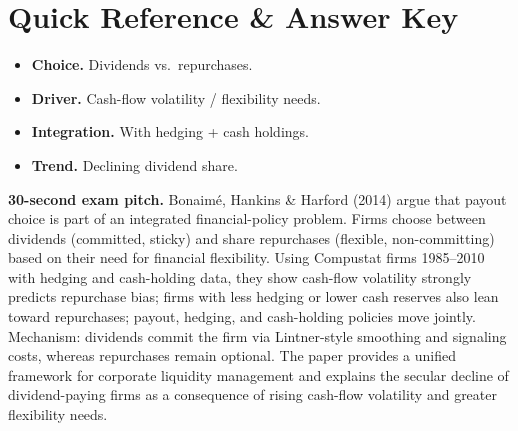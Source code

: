 \documentclass[11pt]{article}
\begin{document}
\section*{Quick Reference \& Answer Key}
\begin{answerbox}
\begin{itemize}
\item \textbf{Choice.} Dividends vs.\ repurchases.
\item \textbf{Driver.} Cash-flow volatility / flexibility needs.
\item \textbf{Integration.} With hedging + cash holdings.
\item \textbf{Trend.} Declining dividend share.
\end{itemize}
\end{answerbox}

\begin{keybox}
\textbf{30-second exam pitch.} Bonaim\'e, Hankins \& Harford (2014) argue that payout choice is part of an integrated financial-policy problem. Firms choose between dividends (committed, sticky) and share repurchases (flexible, non-committing) based on their need for financial flexibility. Using Compustat firms 1985--2010 with hedging and cash-holding data, they show cash-flow volatility strongly predicts repurchase bias; firms with less hedging or lower cash reserves also lean toward repurchases; payout, hedging, and cash-holding policies move jointly. Mechanism: dividends commit the firm via Lintner-style smoothing and signaling costs, whereas repurchases remain optional. The paper provides a unified framework for corporate liquidity management and explains the secular decline of dividend-paying firms as a consequence of rising cash-flow volatility and greater flexibility needs.
\end{keybox}
\end{document}
